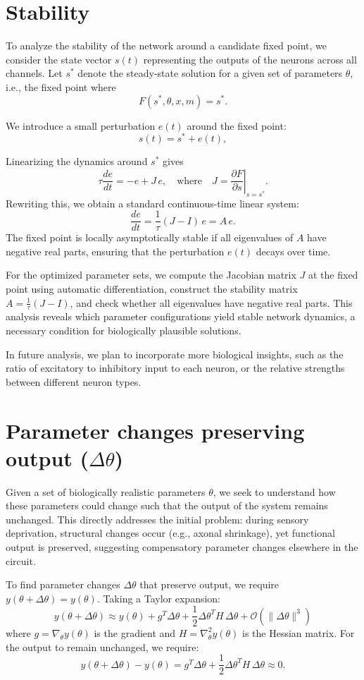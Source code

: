 \documentclass[12pt]{article}
\begin{document}
\section{Stability}

To analyze the stability of the network around a candidate fixed point, we consider the state vector $s(t)$ representing the outputs of the neurons across all channels. Let $s^\ast$ denote the steady-state solution for a given set of parameters $\theta$, i.e., the fixed point where 
\[
F(s^\ast, \theta, x, m) = s^\ast.
\]

We introduce a small perturbation $e(t)$ around the fixed point:
\[
s(t) = s^\ast + e(t),
\]

Linearizing the dynamics around $s^\ast$ gives
\[
\tau \frac{d e}{dt} = - e + J \, e, \quad \text{where} \quad
J = \left. \frac{\partial F}{\partial s} \right|_{s = s^\ast}.
\]
Rewriting this, we obtain a standard continuous-time linear system:
\[
\frac{d e}{dt} = \frac{1}{\tau} (J - I) \, e = A \, e.
\]
The fixed point is locally asymptotically stable if all eigenvalues of $A$ have negative real parts, ensuring that the perturbation $e(t)$ decays over time.

For the optimized parameter sets, we compute the Jacobian matrix $J$ at the fixed point using automatic differentiation, construct the stability matrix $A = \frac{1}{\tau}(J - I)$, and check whether all eigenvalues have negative real parts. This analysis reveals which parameter configurations yield stable network dynamics, a necessary condition for biologically plausible solutions.

In future analysis, we plan to incorporate more biological insights, such as the ratio of excitatory to inhibitory input to each neuron, or the relative strengths between different neuron types. 

\section{Parameter changes preserving output ($\Delta \theta$)}

Given a set of biologically realistic parameters $\theta$, we seek to understand how these parameters could change such that the output of the system remains unchanged. This directly addresses the initial problem: during sensory deprivation, structural changes occur (e.g., axonal shrinkage), yet functional output is preserved, suggesting compensatory parameter changes elsewhere in the circuit.

To find parameter changes $\Delta \theta$ that preserve output, we require $y(\theta + \Delta \theta) = y(\theta)$. Taking a Taylor expansion:
\[
y(\theta + \Delta \theta) \approx y(\theta) + g^T \Delta \theta + \frac{1}{2} \Delta \theta^T H \, \Delta \theta + \mathcal{O}(\|\Delta \theta\|^3)
\]
where $g = \nabla_\theta y(\theta)$ is the gradient and $H = \nabla_\theta^2 y(\theta)$ is the Hessian matrix. For the output to remain unchanged, we require:
\begin{equation}
y(\theta + \Delta \theta) - y(\theta) = g^T \Delta \theta + \frac{1}{2} \Delta \theta^T H \, \Delta \theta \approx 0.
\label{eq:delta_y}
\end{equation}
\end{document}
